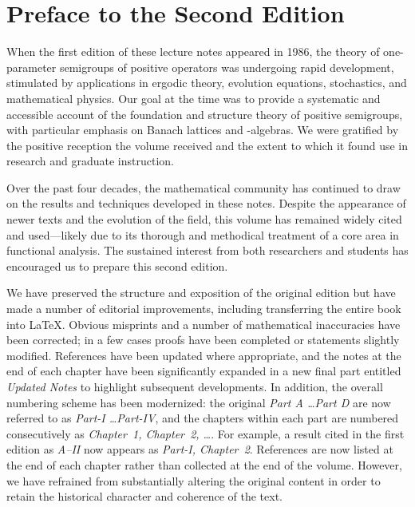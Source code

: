 %

\preface
\setcounter{page}{1}
\thispagestyle{empty}
\section*{Preface to the Second Edition}

When the first edition of these lecture notes appeared in 1986, the theory of one-parameter semigroups of positive operators was undergoing rapid development, stimulated by applications in ergodic theory, evolution equations, stochastics, and mathematical physics. 
Our goal at the time was to provide a systematic and accessible account of the foundation and structure theory of positive semigroups, with particular emphasis on Banach lattices and \CA-algebras. 
We were gratified by the positive reception the volume received and the extent to which it found use in research and graduate instruction.

Over the past four decades, the mathematical community has continued to draw on the results and techniques developed in these notes. 
Despite the appearance of newer texts and the evolution of the field, this volume has remained widely cited and used---likely due to its thorough and methodical treatment of a core area in functional analysis. 
The sustained interest from both researchers and students has encouraged us to prepare this second edition.

We have preserved the structure and exposition of the original edition but have made a number of editorial improvements, including transferring the entire book into \LaTeX{}. 
Obvious misprints and a number of mathematical inaccuracies have been corrected; in a few cases proofs have been completed or statements slightly modified.
References have been updated where appropriate, and the notes at the end of each chapter have been significantly expanded in a new final part entitled \emph{Updated Notes} to highlight subsequent developments.
In addition, the overall numbering scheme has been modernized: the original \emph{Part A \ldots Part D} are now referred to as \emph{Part-I \ldots Part-IV}, and the chapters within each part are numbered consecutively as 
\emph{Chapter~1, Chapter~2, \ldots}. 
For example, a result cited in the first edition as \emph{A–II} now appears as \emph{Part-I, Chapter~2}. 
References are now listed at the end of each chapter rather than collected at the end of the volume. 
However, we have refrained from substantially altering the original content in order to retain the historical character and coherence of the text.

